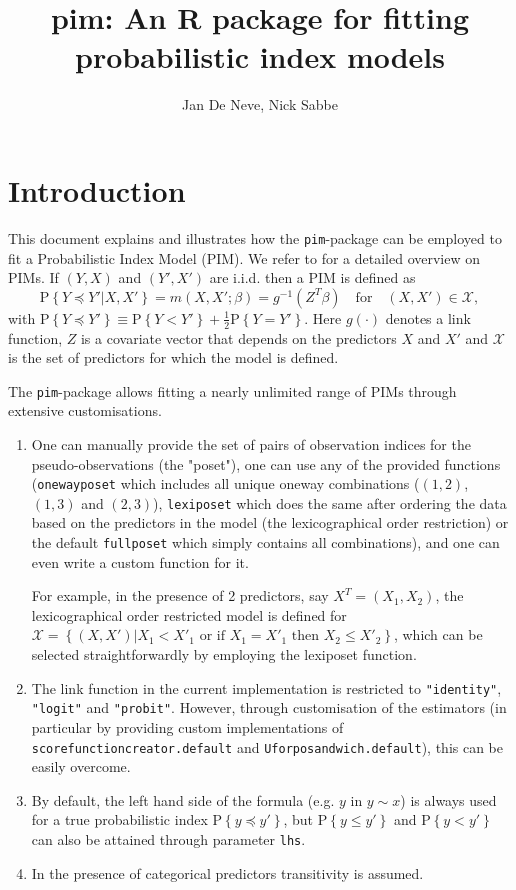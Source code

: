 \documentclass[12pt]{article}
\author{Jan De Neve, Nick Sabbe}
\newcommand{\prob}[1]{\text{P}\left\{#1\right\}}
\newcommand{\leqs}{\preccurlyeq}
\newcommand{\pim}[1]{\texttt{#1}}%
\newcommand{\cd}[1]{\texttt{#1}}%
\begin{document}

\title{pim: An R package for fitting probabilistic index models}

\maketitle
\tableofcontents
\section{Introduction}\label{S_intro}

This document explains and illustrates how the \pim{pim}-package can be employed to fit a Probabilistic Index Model (PIM). We refer to \cite{Thas2012} for a detailed overview on PIMs. If $(Y,X)$ and $(Y',X')$ are i.i.d. then a PIM is defined as
\begin{equation}\label{pim}
\prob{Y \leqs Y' | X, X'} = m(X,X';\beta) = g^{-1}(Z^T \beta) \quad \text{for} \quad (X,X') \in \mathcal{X},
\end{equation}
with $\prob{Y \leqs Y'} \equiv  \prob{Y < Y'} + \frac{1}{2} \prob{Y = Y'}$. Here $g(\cdot)$ denotes a link function, $Z$ is a covariate vector that depends on the predictors $X$ and $X'$ and $\mathcal{X}$ is the set of predictors for which the model is defined. 

The \pim{pim}-package allows fitting a nearly unlimited range of PIMs through extensive customisations.
\begin{enumerate}
\item One can manually provide the set of pairs of observation indices for the pseudo-observations (the "poset"), one can use any of the provided functions (\pim{onewayposet} which includes all unique oneway combinations ($(1,2)$, $(1,3)$ and $(2,3)$), \pim{lexiposet} which does the same after ordering the data based on the predictors in the model (the lexicographical order restriction) or the default \pim{fullposet} which simply contains all combinations), and one can even write a custom function for it.

For example, in the presence of 2 predictors, say $X^T = (X_1, X_2)$, the lexicographical order restricted model is defined for $\mathcal{X} = \left\{ (X,X') | X_1 < X'_1 \text{ or if } X_1 = X'_1 \text{ then } X_2 \leq X'_2 \right\}$, which can be selected straightforwardly by employing the lexiposet function. 
\item The link function in the current implementation is restricted to \cd{"identity"}, \cd{"logit"} and \cd{"probit"}. However, through customisation of the estimators (in particular by providing custom implementations of \pim{scorefunctioncreator.default} and \pim{Uforposandwich.default}), this can be easily overcome.
\item By default, the left hand side of the formula (e.g. $y$ in $y\sim x$) is always used for a true probabilistic index $\prob{y \leqs y' }$, but $\prob{y \leq y' }$ and $\prob{y < y' }$ can also be attained through parameter \cd{lhs}.
\item In the presence of categorical predictors transitivity is assumed.
\end{enumerate} 
\end{document}
